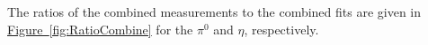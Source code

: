  The ratios of the combined measurements to the combined fits are given in \hyperref[fig:RatioCombine]{Figure~\ref*{fig:RatioCombine}} for the $\pi^0$ and $\eta$, respectively.
%
%
%
%
%
%
%
%

